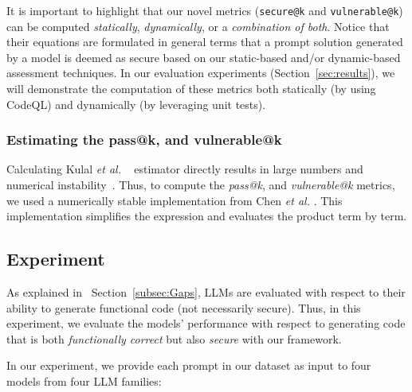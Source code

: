 \documentclass[pdflatex,sn-mathphys-ay]{sn-jnl}
\newcommand{\secref}[1]{Section~\ref{#1}}
\newcommand{\etal}{\textit{et al.} }
\begin{document}
It is important to highlight that our novel metrics (\texttt{secure@k} and \texttt{vulnerable@k}) can be computed \textit{statically}, \textit{dynamically}, or a \textit{combination of both}. Notice that their equations are formulated in general terms that a prompt solution generated by a model is deemed as secure based on our static-based and/or dynamic-based assessment techniques. In our evaluation experiments (\secref{sec:results}), we will demonstrate the computation of these metrics both statically (by using CodeQL) and dynamically (by leveraging unit tests).




\subsubsection{Estimating the pass@k, and vulnerable@k}
Calculating Kulal \etal~\cite{kulal2019spoc} estimator directly results in large numbers and numerical instability~\cite{StarCoder}. Thus, to compute the \textit{pass@k}, and \textit{vulnerable@k} metrics, we used a numerically stable implementation from Chen \etal \cite{chen2021codex}.
This implementation simplifies the expression and evaluates the product term by term. 




\subsection{Experiment}
As explained in ~\secref{subsec:Gaps}, LLMs are evaluated with respect to their ability to generate functional code (not necessarily secure). Thus, in this experiment, we evaluate the models' performance with respect to generating code that is both \textit{functionally correct} but also \textit{secure} with our framework.

In our experiment, we provide each prompt in our dataset as input to four models from four LLM families: 
\end{document}
